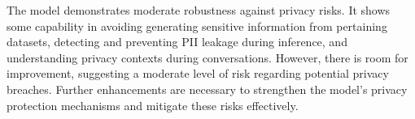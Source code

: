 The model demonstrates moderate robustness against privacy risks. It shows some capability in avoiding generating sensitive information from pertaining datasets, detecting and preventing PII leakage during inference, and understanding privacy contexts during conversations. However, there is room for improvement, suggesting a moderate level of risk regarding potential privacy breaches. Further enhancements are necessary to strengthen the model's privacy protection mechanisms and mitigate these risks effectively.

